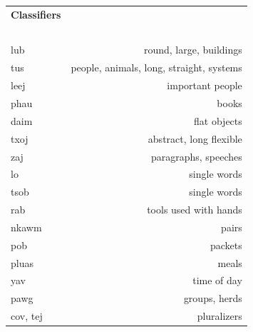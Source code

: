 \documentclass{article}
\begin{document}
\begin{tabular}{l r}
\textbf{Classifiers} \\
~\\
lub &round, large, buildings\\
tus &people, animals, long, straight, systems\\
leej &important people\\
phau &books\\
daim &flat objects\\
txoj &abstract, long flexible\\
zaj &paragraphs, speeches\\
lo &single words\\
tsob &single words\\
rab &tools used with hands\\
nkawm &pairs\\
pob &packets\\
pluas &meals\\
yav &time of day\\
pawg &groups, herds\\
cov, tej &pluralizers\\

\end{tabular}

\clearpage
\end{document}

